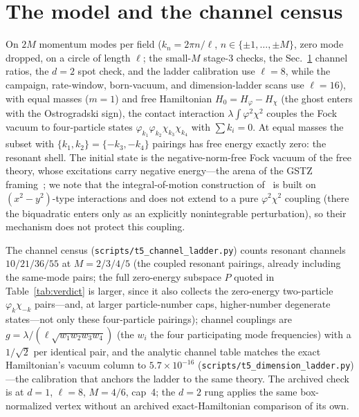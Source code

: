 \documentclass[11pt]{article}
\begin{document}
\section{The model and the channel census}
\label{sec:model}

On $2M$ momentum modes per field ($k_n=2\pi n/\ell$,
$n\in\{\pm1,\dots,\pm M\}$, zero mode dropped, on a circle of length
$\ell$; the small-$M$ stage-3 checks, the Sec.~\ref{sec:model} channel
ratios, the $d=2$ spot check, and the ladder calibration use $\ell=8$,
while the campaign, rate-window, born-vacuum, and dimension-ladder
scans use $\ell=16$),
with equal masses ($m=1$) and free Hamiltonian
$H_0=H_\varphi-H_\chi$ (the ghost enters with the Ostrogradski
sign), the contact interaction
$\lambda\int\varphi^2\chi^2$ couples the Fock vacuum to
four-particle states $\varphi_{k_1}\varphi_{k_2}\chi_{k_3}
\chi_{k_4}$ with $\sum k_i=0$. At equal masses the subset with
$\{k_1,k_2\}=\{-k_3,-k_4\}$ pairings has free energy exactly
zero: the resonant shell. The initial state is the
negative-norm-free Fock vacuum of the free theory, whose
excitations carry negative energy---the arena of the
GSTZ framing~\cite{GSTZ2021}; we note that the integral-of-motion
construction of~\cite{Deffayet2026} is built on $(x^2-y^2)$-type interactions and
does not extend to a pure $\varphi^2\chi^2$ coupling (there the biquadratic
enters only as an explicitly nonintegrable perturbation), so their
mechanism does not protect this coupling.

The channel census (\texttt{scripts/t5\_channel\_ladder.py}) counts
resonant channels $10/21/36/55$ at $M=2/3/4/5$ (the coupled
resonant pairings, already including the same-mode pairs; the full
zero-energy subspace $P$ quoted in Table~\ref{tab:verdict} is larger,
since it also collects the zero-energy two-particle
$\varphi_k\chi_{-k}$ pairs---and, at larger particle-number caps,
higher-number degenerate states---not only these four-particle
pairings);
channel couplings
are $g=\lambda/(\ell\sqrt{w_1w_2w_3w_4})$ (the $w_i$ the four
participating mode frequencies) with a $1/\sqrt2$ per
identical pair, and the analytic channel table matches the exact
Hamiltonian's vacuum column to $5.7\times10^{-16}$
(\texttt{scripts/t5\_dimension\_ladder.py})---the calibration that anchors
the ladder to the same theory. The archived check is at $d=1$,
$\ell=8$, $M=4/6$, cap~4; the $d=2$ rung applies the same
box-normalized vertex without an archived exact-Hamiltonian
comparison of its own.
\end{document}

